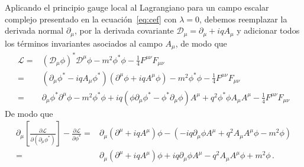 Aplicando el principio gauge local al Lagrangiano para un campo escalar complejo presentado en la ecuación~\ref{eq:cef} con $\lambda=0$, debemos reemplazar la derivada normal $\partial_{\mu}$, por la derivada covariante $\mathcal{D}_{\mu}=\partial_{\mu}+iq A_{\mu}$ y adicionar todos los términos invariantes asociados al campo $A_\mu$, de modo que
\begin{align}
\label{eq:lcv}
  \mathcal{L}=& \left( \mathcal{D}_{\mu} \phi \right)^{*} \mathcal{D}^{\mu}\phi -m^2 \phi^{*}\phi-\frac{1}{4}F^{\mu\nu}F_{\mu\nu} \nonumber\\
             =&\left( \partial_{\mu}\phi^{*}-iq A_{\mu} \phi^{*} \right)\left( \partial^{\mu}\phi+iq A^{\mu} \phi \right) -m^2 \phi^{*}\phi-\frac{1}{4}F^{\mu\nu}F_{\mu\nu} \nonumber\\
              =&\partial_{\mu}\phi^{*}\partial^{\mu}\phi-m^2 \phi^{*}\phi+iq \left(\phi\partial_{\mu}\phi^{*} -\phi^{*}\partial_{\mu}\phi \right) A^{\mu} +q^2 \phi^{*}\phi A_{\mu} A^{\mu} -\frac{1}{4}F^{\mu\nu}F_{\mu\nu} 
\end{align}
De modo que
\begin{align}
  \partial_{\mu} \left[ \frac{\partial \mathcal{L}}{\partial \left( \partial_{\mu}\phi^{*} \right)} \right]-\frac{\partial \mathcal{L}}{\partial \phi^{*}}
=&\partial_{\mu} \left( \partial^{\mu}+iq A^{\mu} \right)\phi -\left(-iq \partial_{\mu}\phi A^{\mu} +q^2 A_{\mu}A^{\mu}\phi-m^{2}\phi  \right) \nonumber\\
 =&\partial_{\mu} \left( \partial^{\mu}+iq A^{\mu} \right)\phi  +iq \partial_{\mu}\phi A^{\mu}-q^2 A_{\mu}A^{\mu}\phi+m^{2}\phi\,.
\end{align}

